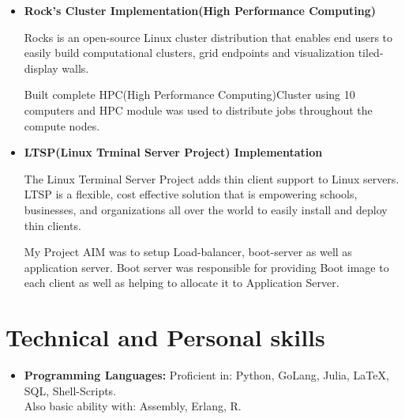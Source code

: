 \documentclass[11pt,a4paper,sans]{moderncv}        %
\begin{document}
{\begin{itemize}
\vspace{3pt}


OpenStreetMap is a map of the world, created by people and free to use under an open license.
I Organized a "Mapping Party" as well as Workshop for School students to tech GPS-Tracking ,
Uploading and Creating maps using GPS trace.
Completed Digital mapping of 20 villages of Punjab with help of school students.

\vspace{6pt}

\item \textbf{Rock's Cluster Implementation(High Performance Computing)}

\vspace{3pt}

Rocks is an open-source Linux cluster distribution that enables end users to easily
build computational clusters,
 grid endpoints and visualization tiled-display walls.

Built complete HPC(High Performance Computing)Cluster using 10 computers and HPC
module was used to distribute jobs throughout the compute nodes.

\vspace{6pt}

\item \textbf{LTSP(Linux Trminal Server Project) Implementation}
\vspace{3pt}

The Linux Terminal Server Project adds thin client support to Linux servers. LTSP is a flexible,
 cost effective solution that is empowering schools, businesses,
 and organizations all over the world to easily install and deploy thin clients.

My Project AIM was to setup Load-balancer, boot-server as well as application
server. Boot server was responsible for providing Boot image to each client as
well as helping to allocate it to Application Server.

\end{itemize}


\section{Technical and Personal skills}

\vspace{6pt}

\begin{itemize}

\item \textbf{Programming Languages:} Proficient in: Python, GoLang, Julia, LaTeX, SQL, Shell-Scripts. \\ Also basic ability with: Assembly, Erlang, R.


\end{itemize}}
\end{document}
